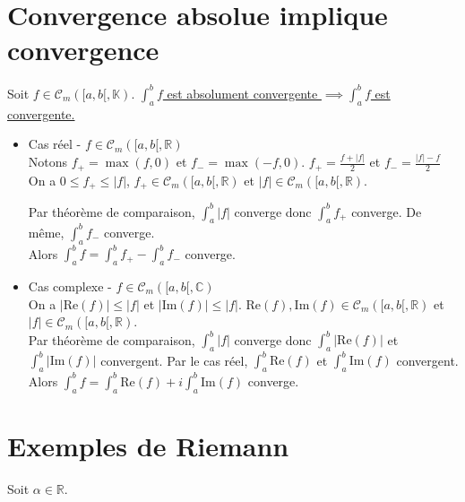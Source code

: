 \documentclass[]{article}
\begin{document}
\section{Convergence absolue implique convergence}

Soit $f \in \mathcal{C}_m([a, b[, \mathbb{K})$. \underline{$\int_{a}^{b} f$ est absolument convergente $\implies \int_{a}^{b} f$ est convergente.} \\

\begin{itemize}
    \item Cas réel - $f \in \mathcal{C}_m([a, b[, \mathbb{R})$ \\
    Notons $f_+ = \max(f, 0)$ et $f_- = \max(-f, 0)$. $f_+ = \frac{f + |f|}{2}$ et $f_- = \frac{|f|-f}{2}$ \\

    On a $0 \leq f_+ \leq |f|$, $f_+ \in \mathcal{C}_m([a, b[, \mathbb{R})$ et $|f| \in \mathcal{C}_m([a, b[, \mathbb{R})$.

    Par théorème de comparaison, $\int_{a}^{b} |f|$ converge donc $\int_{a}^{b} f_+$ converge. De même, $\int_{a}^{b} f_-$ converge. \\

    Alors $\int_{a}^{b} f = \int_{a}^{b} f_+ - \int_{a}^{b} f_-$ converge.

    \item Cas complexe - $f \in \mathcal{C}_m([a, b[, \mathbb{C})$ \\
    On a $|\text{Re}(f)| \leq |f|$ et $|\text{Im}(f)| \leq |f|$. $\text{Re}(f), \text{Im}(f) \in \mathcal{C}_m([a, b[, \mathbb{R})$ et $|f| \in \mathcal{C}_m([a, b[, \mathbb{R})$. \\

    Par théorème de comparaison, $\int_{a}^{b} |f|$ converge donc $\int_{a}^{b} |\text{Re}(f)|$ et $\int_{a}^{b} |\text{Im}(f)|$ convergent. Par le cas réel, $\int_{a}^{b} \text{Re}(f)$ et $\int_{a}^{b} \text{Im}(f)$ convergent. \\

    Alors $\int_{a}^{b} f = \int_{a}^{b} \text{Re}(f) + i \int_{a}^{b} \text{Im}(f)$ converge.
\end{itemize}

\section{Exemples de Riemann}

Soit $\alpha \in \mathbb{R}$. 
\end{document}
